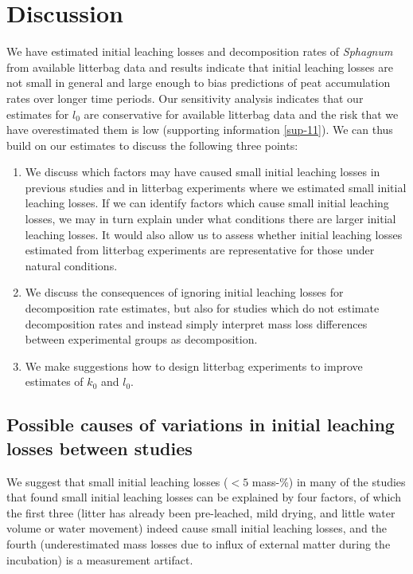 \documentclass[
  12pt,
]{article}
\begin{document}
\hypertarget{discussion}{%
\section{Discussion}\label{discussion}}

We have estimated initial leaching losses and decomposition rates of \emph{Sphagnum} from available litterbag data and results indicate that initial leaching losses are not small in general and large enough to bias predictions of peat accumulation rates over longer time periods. Our sensitivity analysis indicates that our estimates for \(l_0\) are conservative for available litterbag data and the risk that we have overestimated them is low (supporting information \ref{sup-11}). We can thus build on our estimates to discuss the following three points:

\begin{enumerate}
\def\labelenumi{\arabic{enumi}.}
\item
  We discuss which factors may have caused small initial leaching losses in previous studies and in litterbag experiments where we estimated small initial leaching losses. If we can identify factors which cause small initial leaching losses, we may in turn explain under what conditions there are larger initial leaching losses. It would also allow us to assess whether initial leaching losses estimated from litterbag experiments are representative for those under natural conditions.
\item
  We discuss the consequences of ignoring initial leaching losses for decomposition rate estimates, but also for studies which do not estimate decomposition rates and instead simply interpret mass loss differences between experimental groups as decomposition.
\item
  We make suggestions how to design litterbag experiments to improve estimates of \(k_0\) and \(l_0\).
\end{enumerate}

\hypertarget{out-discussion-2}{%
\subsection{Possible causes of variations in initial leaching losses between studies}\label{out-discussion-2}}

We suggest that small initial leaching losses (\(<5\) mass-\%) in many of the studies that found small initial leaching losses can be explained by four factors, of which the first three (litter has already been pre-leached, mild drying, and little water volume or water movement) indeed cause small initial leaching losses, and the fourth (underestimated mass losses due to influx of external matter during the incubation) is a measurement artifact.
\end{document}
